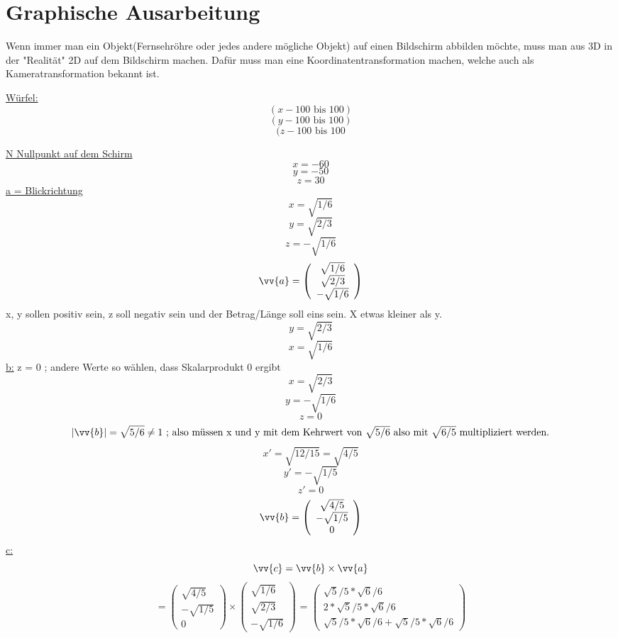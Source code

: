 \section{\textbf{Graphische Ausarbeitung}}

Wenn immer man ein Objekt(Fernsehröhre oder jedes andere mögliche Objekt) auf einen Bildschirm abbilden möchte, muss man aus 3D in der "Realität" 2D auf dem Bildschirm machen. Dafür muss man eine Koordinatentransformation machen, welche auch als Kameratransformation bekannt ist.

\underline{Würfel:}
$$(x -100 \mbox{ bis }  100)$$
$$(y-100\mbox{ bis }100)$$
$$(z-100\mbox{ bis }100$$

\underline{N Nullpunkt auf dem Schirm}
$$x = -60$$
$$y = -50$$
$$z = 30$$
\underline{a = Blickrichtung}
$$x = \sqrt{1/6}$$
$$y = \sqrt{2/3}$$
$$z = -\sqrt{1/6}$$
$$\vv{a}=\left(\begin{array}{c} 
     \sqrt{1/6}\\ \sqrt{2/3}\\-\sqrt{1/6}\end{array}\right) $$
x, y sollen positiv sein, z soll negativ sein und der Betrag/Länge soll eins sein. X etwas kleiner als y.
$$y= \sqrt{2/3}$$
$$x= \sqrt{1/6}$$
\underline{b:}
z = 0 ; andere Werte so wählen, dass Skalarprodukt 0 ergibt
$$x= \sqrt{2/3}$$
$$y=-\sqrt{1/6}$$
$$z=0$$
$$|\vv{b}| = \sqrt{5/6}\neq 1\mbox{ ; also müssen x und y mit dem Kehrwert von $\sqrt{5/6}$ also mit $\sqrt{6/5}$ multipliziert werden.}$$
$$x' = \sqrt{12/15} = \sqrt{4/5}$$
$$y' = - \sqrt{1/5}$$
$$z' = 0$$
$$\vv{b}=\left(\begin{array}{c} 
      \sqrt{4/5}\\ -\sqrt{1/5}\\0\end{array}\right) $$
\underline{c:}
$$\vv{c} = \vv{b}\times  \vv{a}$$
$$= \left(\begin{array}{c} 
     \sqrt{4/5}\\-\sqrt{1/5}\\0\end{array}\right)
      \times \left(\begin{array}{c} 
     \sqrt{1/6}\\\sqrt{2/3}\\-\sqrt{1/6}\end{array}\right) \mbox{ = } 
     \left(\begin{array}{c} 
     \sqrt{5}/5*\sqrt{6}/6\\2*\sqrt{5}/5*\sqrt{6}/6\\\sqrt{5}/5*\sqrt{6}/6+ \sqrt{5}/5*\sqrt{6}/6\end{array}\right)
$$
